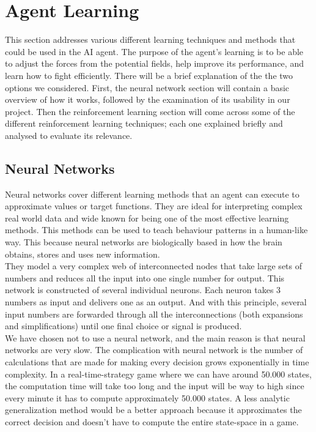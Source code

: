 \section{Agent Learning}\label{agent_learning}

This section addresses various different learning techniques and methods that could be used in the AI agent. The purpose of the agent's learning is to be able to adjust the forces from the potential fields, help improve its performance, and learn how to fight efficiently. There will be a brief explanation of the the two options we considered. First, the neural network section will contain a basic overview of how it works, followed by the examination of its usability in our project. Then the reinforcement learning section will come across some of the different reinforcement learning techniques;  each one explained briefly and analysed to evaluate its relevance. \\

\subsection*{Neural Networks}
Neural networks cover different learning methods that an agent can execute to approximate values or target functions. They are ideal for interpreting complex real world data and wide known for being one of the most effective learning methods. This methods can be used to teach behaviour patterns in a human-like way. This because neural networks are biologically based in how the brain obtains, stores and uses new information.\\


They model a very complex web of interconnected nodes that take large sets of numbers and reduces all the input into one single number for output. This network is constructed of several individual neurons. Each neuron takes 3 numbers as input and delivers one as an output. And with this principle, several input numbers are forwarded through all the interconnections (both expansions and simplifications) until one final choice or signal is produced. \\


We have chosen not to use a neural network, and the main reason is that neural networks are very slow. The complication with neural network is the number of calculations that are made for making every decision grows exponentially in time complexity. In a real-time-strategy game where we can have around 50.000 states, the computation time will take too long and the input will be way to high since every minute it has to compute approximately 50.000 states. A less analytic generalization method would be a better approach because it approximates the correct decision and doesn't have to compute the entire state-space in a game. \\


